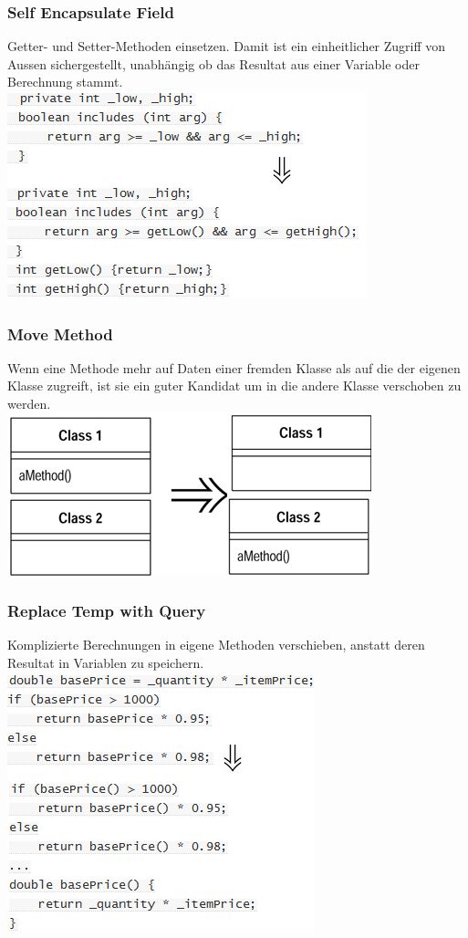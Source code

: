 \documentclass[a4paper,10pt]{article}
\begin{document}
\subsubsection{Self Encapsulate Field}
Getter- und Setter-Methoden einsetzen. Damit ist ein einheitlicher Zugriff von Aussen sichergestellt, unabhängig ob das Resultat aus einer Variable oder Berechnung stammt.\\
\includegraphics[scale=.6]{refactoring_2.png}
\subsubsection{Move Method}
Wenn eine Methode mehr auf Daten einer fremden Klasse als auf die der eigenen Klasse zugreift, ist sie ein guter Kandidat um in die andere Klasse verschoben zu werden.\\
\includegraphics[scale=.6]{refactoring_3.png}
\subsubsection{Replace Temp with Query}
Komplizierte Berechnungen in eigene Methoden verschieben, anstatt deren Resultat in Variablen zu speichern.\\
\includegraphics[scale=.6]{refactoring_4.png}
\end{document}
